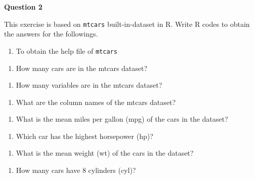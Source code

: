 \documentclass[
  letterpaper,
  DIV=11,
  numbers=noendperiod]{scrreprt}
\providecommand{\tightlist}{%
  \setlength{\itemsep}{0pt}\setlength{\parskip}{0pt}}\usepackage{longtable,booktabs,array}
\begin{document}
\textbf{Question 2}

This exercise is based on \texttt{mtcars} built-in-dataset in R. Write R
codes to obtain the answers for the followings.

\begin{enumerate}
\def\labelenumi{\arabic{enumi}.}
\tightlist
\item
  To obtain the help file of \texttt{mtcars}
\end{enumerate}

\begin{enumerate}
\def\labelenumi{\arabic{enumi}.}
\setcounter{enumi}{1}
\tightlist
\item
  How many cars are in the mtcars dataset?
\end{enumerate}

\begin{enumerate}
\def\labelenumi{\arabic{enumi}.}
\setcounter{enumi}{2}
\tightlist
\item
  How many variables are in the mtcars dataset?
\end{enumerate}

\begin{enumerate}
\def\labelenumi{\arabic{enumi}.}
\setcounter{enumi}{3}
\tightlist
\item
  What are the column names of the mtcars dataset?
\end{enumerate}

\begin{enumerate}
\def\labelenumi{\arabic{enumi}.}
\setcounter{enumi}{4}
\tightlist
\item
  What is the mean miles per gallon (mpg) of the cars in the dataset?
\end{enumerate}

\begin{enumerate}
\def\labelenumi{\arabic{enumi}.}
\setcounter{enumi}{5}
\tightlist
\item
  Which car has the highest horsepower (hp)?
\end{enumerate}

\begin{enumerate}
\def\labelenumi{\arabic{enumi}.}
\setcounter{enumi}{6}
\tightlist
\item
  What is the mean weight (wt) of the cars in the dataset?
\end{enumerate}

\begin{enumerate}
\def\labelenumi{\arabic{enumi}.}
\setcounter{enumi}{7}
\tightlist
\item
  How many cars have 8 cylinders (cyl)?
\end{enumerate}
\end{document}
